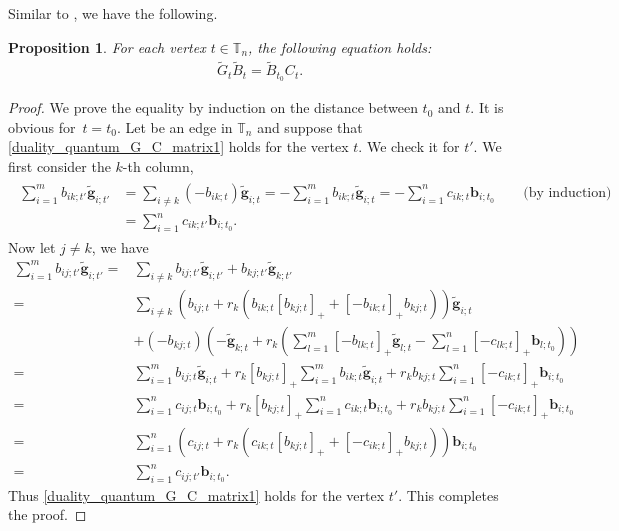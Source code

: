 \documentclass[pdftex]{sigma}
\numberwithin{equation}{section}
\newtheorem{Proposition}[Theorem]{Proposition}
 { \theoremstyle{definition}
\newtheorem{Definition}[Theorem]{Definition}
\newtheorem{Note}[Theorem]{Note}
\newtheorem{Example}[Theorem]{Example}
\newtheorem{Remark}[Theorem]{Remark} }
\begin{document}
Similar to \cite[equation (6.14)]{fomin_zelevinsky_2007}, we have the following.
\begin{Proposition}
 For each vertex $t\in \mathbb{T}_n$, the following equation holds:
 \begin{align}\label{duality_quantum_G_C_matrix1}
 \tilde{G}_{t}\tilde{B}_{t}=\tilde{B}_{t_0}C_{t}.
 \end{align}
\end{Proposition}
\begin{proof}

 We prove the equality by induction on the distance between $t_0$ and $t$.
 It is obvious for~${t=t_0}$. Let  be an edge in $\mathbb{T}_n$ and suppose that \eqref{duality_quantum_G_C_matrix1} holds for the vertex $t$. We check it for $t'$. We first consider the $k$-th column,
 \begin{align*}
 \begin{aligned}
 \sum\limits^{m}_{i=1}b_{ik;t'}\mathbf{\tilde{g}}_{i;t'}
 &=\sum\limits_{i\neq k}(-b_{ik;t})\mathbf{\tilde{g}}_{i;t}=-\sum\limits^{m}_{i=1}b_{ik;t}\mathbf{\tilde{g}}_{i;t}=-\sum\limits^{n}_{i=1}c_{ik;t}\mathbf{b}_{i;t_0}\qquad
 \text{(by induction)}\\
 &=\sum\limits^{n}_{i=1}c_{ik;t'}\mathbf{b}_{i;t_0}.
 \end{aligned}
 \end{align*}
 Now let $j\neq k$, we have
 \begin{align*}
 \sum\limits^{m}_{i=1}b_{ij;t'}\mathbf{\tilde{g}}_{i;t'}
 ={}&\sum\limits_{i\neq k}b_{ij;t'}\mathbf{\tilde{g}}_{i;t'}+b_{kj;t'}\mathbf{\tilde{g}}_{k;t'}\\
 ={}&\sum\limits_{i\neq k}(b_{ij;t}+r_{k}(b_{ik;t}[b_{kj;t}]_{+}+[-b_{ik;t}]_{+}b_{kj;t}))\mathbf{\tilde{g}}_{i;t}\\
 & +(-b_{kj;t})\left(-\mathbf{\tilde{g}}_{k;t}+r_{k}\left(\sum\limits^{m}_{l=1}[-b_{lk;t}]_{+}\mathbf{\tilde{g}}_{l;t}-\sum\limits^{n}_{l=1}[-c_{lk;t}]_{+}\mathbf{b}_{l;t_0}\right)\right)\\
 ={}&\sum\limits^{m}_{i=1}b_{ij;t}\mathbf{\tilde{g}}_{i;t}+r_{k}[b_{kj;t}]_{+}\sum\limits^{m}_{i=1}b_{ik;t}\mathbf{\tilde{g}}_{i;t}+r_{k}b_{kj;t}\sum\limits^{n}_{i=1}[-c_{ik;t}]_{+}\mathbf{b}_{i;t_0}\\
 ={}&\sum\limits_{i=1}^{n}c_{ij;t}\mathbf{b}_{i;t_0}+r_{k}[b_{kj;t}]_{+}\sum\limits^{n}_{i=1}c_{ik;t}\mathbf{b}_{i;t_0}+r_{k}b_{kj;t}\sum\limits^{n}_{i=1}[-c_{ik;t}]_{+}\mathbf{b}_{i;t_0}\\
 ={}&\sum\limits_{i=1}^{n}(c_{ij;t}+r_{k}(c_{ik;t}[b_{kj;t}]_{+}+[-c_{ik;t}]_{+}b_{kj;t}))\mathbf{b}_{i;t_0}\\
 ={}&\sum\limits_{i=1}^{n}c_{ij;t'}\mathbf{b}_{i;t_0}.
 \end{align*}
 Thus \eqref{duality_quantum_G_C_matrix1} holds for the vertex $t'$. This completes the proof.
\end{proof}
\end{document}
